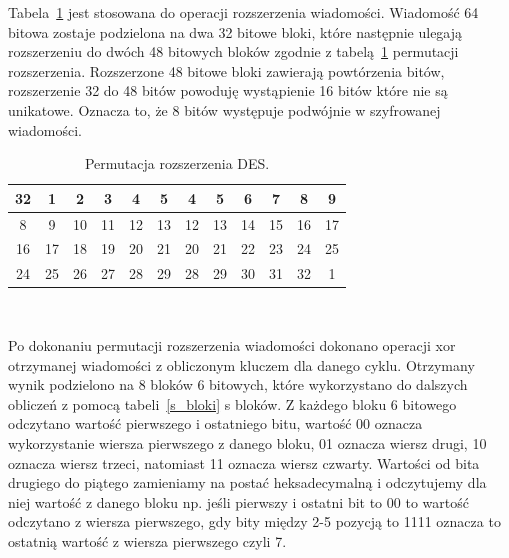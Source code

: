 \documentclass[12p]{article}
\begin{document}
Tabela~\ref{per_rozszerzenia} jest stosowana do operacji rozszerzenia wiadomości. Wiadomość 64 bitowa zostaje podzielona na dwa 32 bitowe bloki, które następnie ulegają rozszerzeniu do dwóch 48 bitowych bloków zgodnie z tabelą~\ref{per_rozszerzenia} permutacji rozszerzenia. Rozszerzone 48 bitowe bloki zawierają powtórzenia bitów, rozszerzenie 32 do 48 bitów powoduję wystąpienie 16 bitów które nie są unikatowe. Oznacza to, że 8 bitów występuje podwójnie w szyfrowanej wiadomości.

\begin{table}[H]
\centering
\begin{tabular}{|c|c|c|c|c|c|c|c|c|c|c|c|}
\hline
32 & 1 & 2 & 3 & 4 & 5 & 4 & 5 & 6 & 7 & 8 & 9\\
\hline
8 & 9 & 10 & 11 & 12 & 13 & 12 & 13 & 14 & 15 & 16 & 17\\
\hline
16 & 17 & 18 & 19 & 20 & 21 & 20 & 21 & 22 & 23 & 24 & 25\\
\hline
24 & 25 & 26 & 27 & 28 & 29 & 28 & 29 & 30 & 31 & 32 & 1\\
\hline
\end{tabular}
\caption{Permutacja rozszerzenia DES.}~\label{per_rozszerzenia}
\end{table}

Po dokonaniu permutacji rozszerzenia wiadomości dokonano operacji xor otrzymanej wiadomości z obliczonym kluczem dla danego cyklu. Otrzymany wynik podzielono na 8 bloków 6 bitowych, które wykorzystano do dalszych obliczeń z pomocą tabeli~\ref{s_bloki} s bloków. Z każdego bloku 6 bitowego odczytano wartość pierwszego i ostatniego bitu, wartość 00 oznacza wykorzystanie wiersza pierwszego z danego bloku, 01 oznacza wiersz drugi, 10 oznacza wiersz trzeci, natomiast 11 oznacza wiersz czwarty. Wartości od bita drugiego do piątego zamieniamy na postać heksadecymalną i odczytujemy dla niej wartość z danego bloku np. jeśli pierwszy i ostatni bit to 00 to wartość odczytano z wiersza pierwszego, gdy bity między 2-5 pozycją to 1111 oznacza to ostatnią wartość z wiersza pierwszego czyli 7.
\end{document}
